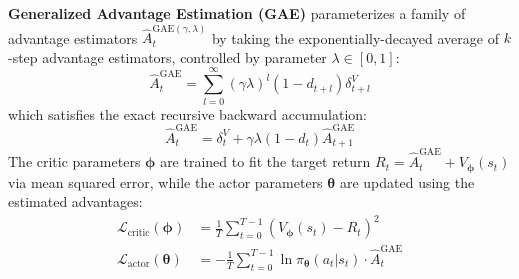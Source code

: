 \documentclass[11pt,a4paper]{article}
\theoremstyle{definition}
\begin{document}
\textbf{Generalized Advantage Estimation (GAE)} parameterizes a family of advantage estimators $\widehat{A}_t^{\text{GAE}(\gamma, \lambda)}$ by taking the exponentially-decayed average of $k$-step advantage estimators, controlled by parameter $\lambda \in [0, 1]$:
{\boldmath
\begin{equation}
\widehat{A}_t^{\text{GAE}} = \sum_{l=0}^\infty (\gamma \lambda)^l (1 - d_{t+l}) \delta_{t+l}^V
\end{equation}
}
which satisfies the exact recursive backward accumulation:
{\boldmath
\begin{equation}
\widehat{A}_t^{\text{GAE}} = \delta_t^V + \gamma \lambda (1 - d_t) \widehat{A}_{t+1}^{\text{GAE}}
\end{equation}
}
The critic parameters $\boldsymbol{\phi}$ are trained to fit the target return $R_t = \widehat{A}_t^{\text{GAE}} + V_{\boldsymbol{\phi}}(s_t)$ via mean squared error, while the actor parameters $\boldsymbol{\theta}$ are updated using the estimated advantages:
{\boldmath
\begin{align}
\mathcal{L}_{\text{critic}}(\boldsymbol{\phi}) &= \frac{1}{T}\sum_{t=0}^{T-1} \left( V_{\boldsymbol{\phi}}(s_t) - R_t \right)^2 \\
\mathcal{L}_{\text{actor}}(\boldsymbol{\theta}) &= - \frac{1}{T}\sum_{t=0}^{T-1} \ln \pi_{\boldsymbol{\theta}}(a_t | s_t) \cdot \widehat{A}_t^{\text{GAE}}
\end{align}
}
\end{document}

